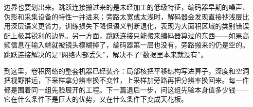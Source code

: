 边界也要划出来。跳跃连接搬过来的是未经加工的低级特征，编码器早期的噪声、伪影和采集设备的特性一并进来；旁路太宽或太浅时，解码器会发现直接抄浅层比用深层语义更省力，训练损失下降但语义判断退化，表现为大面积区域的类别错误配上极其锐利的边界。另一方面，跳跃连接只能搬来编码器算过的东西——如果高频信息在输入端就被镜头模糊掉了，编码器第一层也没有，旁路搬来的仍是空的。跳跃连接解决的是``网络内部丢失''，解决不了``数据里本来就没有''。

到这里，卷积网络的整套机器已经装齐：局部核把平移结构写进算子，深度和空洞把视野推远，下采样拿分辨率换不变性，上采样加旁路再把分辨率换回来。每一件都是围着同一组先验展开的工程。下一篇退后一步，问这组先验本身值多少钱——它在什么条件下是巨大的优势，又在什么条件下变成天花板。
